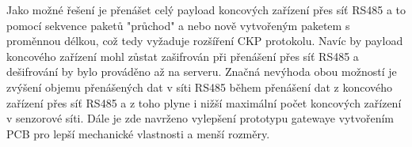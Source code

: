 Jako možné řešení je přenášet celý payload koncových zařízení přes síť RS485 a to pomocí sekvence paketů "průchod" a nebo nově vytvořeným paketem s proměnnou délkou, což tedy vyžaduje rozšíření CKP protokolu. Navíc by payload koncového zařízení mohl zůstat zašifrován při přenášení přes síť RS485 a dešifrování by bylo prováděno až na serveru.
Značná nevýhoda obou možností je zvýšení objemu přenášených dat v síti RS485 během přenášení dat z koncového zařízení přes síť RS485 a z toho plyne i nižší maximální počet koncových zařízení v senzorové síti.
Dále je zde navrženo vylepšení prototypu gatewaye vytvořením PCB pro lepší mechanické vlastnosti a menší rozměry.













